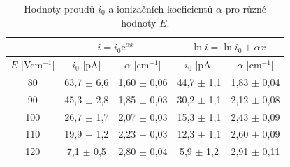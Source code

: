 \documentclass[a4paper,12pt]{article}
\newcommand{\e}{\text{e}}
\begin{document}
\begin{center}
	\begin{table}[h]
		\centering
		\caption{Hodnoty proudů $i_0$ a ionizačních koeficientů $\alpha$ pro různé hodnoty $E$.}
		\label{tab1}
		\begin{tabular}{|c|c|c|c|c|} \hline
			\multicolumn{1}{|c|}{}  & \multicolumn{2}{c|}{$i = i_0 \e^{\alpha 
			x}$}& \multicolumn{2}{c|}{$\ln i = \ln i_0 + \alpha x$}  \\ \hline
			$E$ [Vcm$^{-1}$] & $i_0$ [pA] & $\alpha$ [cm$^{-1}$] & $i_0$ [pA] & $\alpha$ [cm$^{-1}$] \\ \hline
			80 & 63,7 $\pm$ 6,6 & 1,60 $\pm$ 0,06 & 44,7 $\pm$ 1,1 & 1,83 $\pm$ 
			0,04\\ \hline
			90 & 45,3 $\pm$ 2,8 & 1,85 $\pm$ 0,03& 30,2 $\pm$ 1,1 & 2,12 $\pm$ 
			0,08\\ \hline
			100 & 26,7 $\pm$ 1,7 & 2,07 $\pm$ 0,03 & 15,3 $\pm$ 1,1 & 2,43 
			$\pm$ 0,09\\ \hline
			110 & 19,9 $\pm$ 1,2 & 2,23 $\pm$ 0,03 & 12,3 $\pm$ 1,1 & 2,60 
			$\pm$ 0,09 \\ \hline
			120 & 7,1 $\pm$ 0,5 & 2,80 $\pm$ 0,04 & 5,9 $\pm$ 1,2 & 2,91 
			$\pm$ 0,11 \\ \hline
			
		\end{tabular}
	\end{table}
\end{center}

%			
\end{document}
